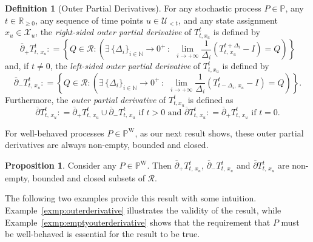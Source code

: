\documentclass[10pt,a4paper]{paper}
\theoremstyle{definition}
\newtheorem{proposition}[theorem]{Proposition}
\newtheorem{definition}{Definition}
\newcommand{\nats}{\mathbb{N}}
\newcommand{\reals}{\mathbb{R}}
\newcommand{\realsnonneg}{\reals_{\geq 0}}
\newcommand{\states}{\mathcal{X}}
\newcommand{\processes}{\mathbb{P}}
\newcommand{\wprocesses}{\processes^{\mathrm{W}}}
\newcommand{\coloneqq}{:\!=}
\begin{document}
\begin{definition}[Outer Partial Derivatives]\label{def:outerpartialderivatives}
For any stochastic process $P\in\processes$, any $t\in\realsnonneg$, any sequence of time points $u\in\mathcal{U}_{<t}$, and any state assignment $x_u\in\states_u$, the \emph{right-sided outer partial derivative} of $T_{t,x_u}^t$ is defined by
\begin{equation}
\overline{\partial}_{+}
{T^t_{t,\,x_u}}
\coloneqq
\left\{
Q\in\mathcal{R}
\colon
\left(\exists \,\{\Delta_i\}_{i\in\nats}\to0^+\,:\,
~
\lim_{i\to+\infty}
\frac{1}{\Delta_i}
(T^{t+\Delta_i}_{t,\,x_u}-I)
=Q
\right)
\right\}\label{eq:rightouterderivative}
\end{equation}
and, if $t\neq0$, the \emph{left-sided} \emph{outer partial derivative} of $T_{t,x_u}^t$ is defined by
\begin{equation}
\overline{\partial}_{-}
{T^t_{t,\,x_u}}
\coloneqq
\left\{
Q\in\mathcal{R}
\colon
\left(\exists\, \{\Delta_i\}_{i\in\nats}\to0^+\,:\,
~
\lim_{i\to+\infty}
\frac{1}{\Delta_i}
(T^{t}_{t-\Delta_i,\,x_u}-I)
=Q
\right)\label{eq:leftouterderivative}
\right\}.
\end{equation}
Furthermore, the \emph{outer partial derivative} of $T_{t,x_u}^t$ is defined as
\begin{equation*}
\overline{\partial}
{T^t_{t,\,x_u}}
\coloneqq
\overline{\partial}_{+}
{T^t_{t,\,x_u}}
\cup
\overline{\partial}_{-}
{T^t_{t,\,x_u}}
\text{ if $t>0$ and }
\overline{\partial}
{T^t_{t,\,x_u}}
\coloneqq
\overline{\partial}_{+}
{T^t_{t,\,x_u}}
\text{ if $t=0$}.
\end{equation*}\vspace{-10pt}
\end{definition}

For well-behaved processes $P\in\wprocesses$, as our next result shows, these outer partial derivatives are always non-empty, bounded and closed.

\begin{proposition}\label{prop:boundednon-emptyandclosed}
Consider any $P\in\wprocesses$. Then $\overline{\partial}_{+}
{T^t_{t,\,x_u}}$, $\overline{\partial}_{-}
{T^t_{t,\,x_u}}$ and $\overline{\partial}
{T^t_{t,\,x_u}}$ are non-empty, bounded and closed subsets of $\mathcal{R}$.
\end{proposition}

The following two examples provide this result with some intuition. Example~\ref{exmp:outerderivative} illustrates the validity of the result, while Example~\ref{exmp:emptyouterderivative} shows that the requirement that $P$ must be well-behaved is essential for the result to be true.
\end{document}
